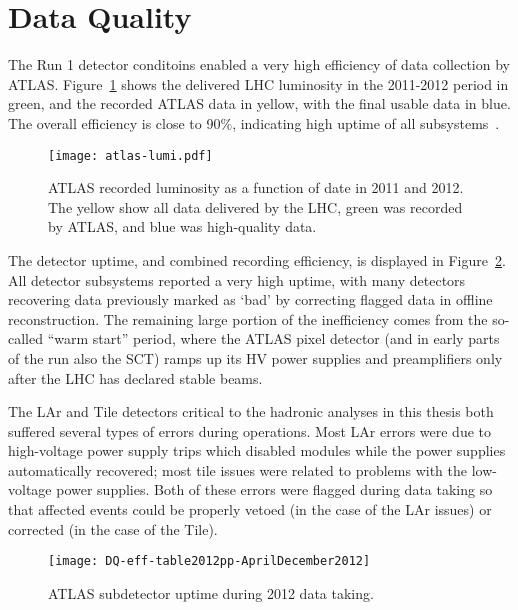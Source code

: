 \section{Data Quality}
\label{atlas:data-quality}

The Run 1 detector conditoins enabled a very high efficiency of data collection by ATLAS. Figure~\ref{fig:detector:lumi} shows the delivered LHC luminosity in the 2011-2012 period in green, and the recorded ATLAS data in yellow, with the final usable data in blue. The overall efficiency is close to 90$\%$, indicating high uptime of all subsystems~\cite{ATLASDQ}.


\begin{figure}
\centering
\texttt{[image: atlas-lumi.pdf]}
\label{fig:detector:lumi}
\caption{ATLAS recorded luminosity as a function of date in 2011 and 2012. The yellow show all data delivered by the LHC, green was recorded by ATLAS, and blue was high-quality data.}
\end{figure}


The detector uptime, and combined recording efficiency, is displayed in Figure~\ref{fig:detector:uptime}. All detector subsystems reported a very high uptime, with many detectors recovering data previously marked as `bad' by correcting flagged data in offline reconstruction. The remaining large portion of the inefficiency comes from the so-called ``warm start'' period, where the ATLAS pixel detector (and in early parts of the run also the SCT) ramps up its HV power supplies and preamplifiers only after the LHC has declared stable beams.

The LAr and Tile detectors critical to the hadronic analyses in this thesis both suffered several types of errors during operations. Most LAr errors were due to high-voltage power supply trips which disabled modules while the power supplies automatically recovered; most tile issues were related to problems with the low-voltage power supplies. Both of these errors were flagged during data taking so that affected events could be properly vetoed (in the case of the LAr issues) or corrected (in the case of the Tile).


\begin{figure}
\centering
\texttt{[image: DQ-eff-table2012pp-AprilDecember2012]}
\label{fig:detector:uptime}
\caption{ATLAS subdetector uptime during 2012 data taking.}
\end{figure}

